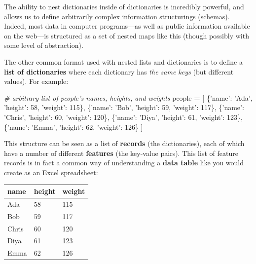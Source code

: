 \documentclass[]{book}
\newenvironment{Shaded}{\begin{snugshade}}{\end{snugshade}}
\newcommand{\DecValTok}[1]{\textcolor[rgb]{0.00,0.00,0.81}{#1}}
\newcommand{\StringTok}[1]{\textcolor[rgb]{0.31,0.60,0.02}{#1}}
\newcommand{\CommentTok}[1]{\textcolor[rgb]{0.56,0.35,0.01}{\textit{#1}}}
\newcommand{\OperatorTok}[1]{\textcolor[rgb]{0.81,0.36,0.00}{\textbf{#1}}}
\newcommand{\NormalTok}[1]{#1}
\begin{document}
The ability to nest dictionaries inside of dictionaries is incredibly
powerful, and allows us to define arbitrarily complex information
structurings (schemas). Indeed, most data in computer programs---as well
as public information available on the web---is structured as a set of
nested maps like this (though possibly with some level of abstraction).

The other common format used with nested lists and dictionaries is to
define a \textbf{list of dictionaries} where each dictionary has
\emph{the same keys} (but different values). For example:

\begin{Shaded}
\begin{Highlighting}[]
\CommentTok{# arbitrary list of people's names, heights, and weights}
\NormalTok{people }\OperatorTok{=}\NormalTok{ [}
\NormalTok{    \{}\StringTok{'name'}\NormalTok{: }\StringTok{'Ada'}\NormalTok{, }\StringTok{'height'}\NormalTok{: }\DecValTok{58}\NormalTok{, }\StringTok{'weight'}\NormalTok{: }\DecValTok{115}\NormalTok{\},}
\NormalTok{    \{}\StringTok{'name'}\NormalTok{: }\StringTok{'Bob'}\NormalTok{, }\StringTok{'height'}\NormalTok{: }\DecValTok{59}\NormalTok{, }\StringTok{'weight'}\NormalTok{: }\DecValTok{117}\NormalTok{\},}
\NormalTok{    \{}\StringTok{'name'}\NormalTok{: }\StringTok{'Chris'}\NormalTok{, }\StringTok{'height'}\NormalTok{: }\DecValTok{60}\NormalTok{, }\StringTok{'weight'}\NormalTok{: }\DecValTok{120}\NormalTok{\},}
\NormalTok{    \{}\StringTok{'name'}\NormalTok{: }\StringTok{'Diya'}\NormalTok{, }\StringTok{'height'}\NormalTok{: }\DecValTok{61}\NormalTok{, }\StringTok{'weight'}\NormalTok{: }\DecValTok{123}\NormalTok{\},}
\NormalTok{    \{}\StringTok{'name'}\NormalTok{: }\StringTok{'Emma'}\NormalTok{, }\StringTok{'height'}\NormalTok{: }\DecValTok{62}\NormalTok{, }\StringTok{'weight'}\NormalTok{: }\DecValTok{126}\NormalTok{\}}
\NormalTok{]}
\end{Highlighting}
\end{Shaded}

This structure can be seen as a list of \textbf{records} (the
dictionaries), each of which have a number of different
\textbf{features} (the key-value pairs). This list of feature records is
in fact a common way of understanding a \textbf{data table} like you
would create as an Excel spreadsheet:

\begin{longtable}[]{@{}lll@{}}
\toprule
name & height & weight\tabularnewline
\midrule
\endhead
Ada & 58 & 115\tabularnewline
Bob & 59 & 117\tabularnewline
Chris & 60 & 120\tabularnewline
Diya & 61 & 123\tabularnewline
Emma & 62 & 126\tabularnewline
\bottomrule
\end{longtable}
\end{document}
